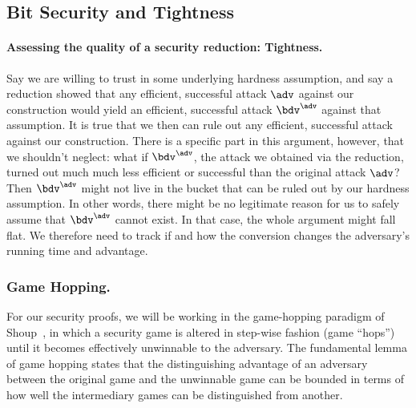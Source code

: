 
	\subsection{Bit Security and Tightness}\label{subsec:Tightness}
		
		\paragraph{Assessing the quality of a security reduction: Tightness.}
			Say we are willing to trust in some underlying hardness assumption,
			and say a reduction showed that any efficient, successful attack $\adv$ against our construction
			would yield an efficient, successful attack $\bdv^\adv$ against that assumption.
			It is true that we then can rule out any efficient, successful attack against our construction.
			There is a specific part in this argument, however, that we shouldn't neglect:
			what if $\bdv^\adv$, the attack we obtained via the reduction,
			turned out much much less efficient or successful than the original attack $\adv$?
			Then $\bdv^\adv$ might not live in the bucket that can be ruled out by our hardness assumption.
			In other words, there might be no legitimate reason for us to safely assume
			that $\bdv^\adv$ cannot exist.
			In that case, the whole argument might fall flat.
			We therefore need to track if and how the conversion changes the adversary's running time and advantage.
			
	
    \subsubsection{Game Hopping.}
      For our security proofs, we will be working in the game-hopping
        paradigm of Shoup~\cite{EPRINT:Shoup04},
        in which a security game is altered in step-wise fashion (game ``hops'') until it becomes 
        effectively unwinnable to the adversary.
        The fundamental lemma of game hopping states that the distinguishing advantage
        of an adversary between the original game and the unwinnable game
        can be bounded in terms of how well the intermediary games
        can be distinguished from another.

